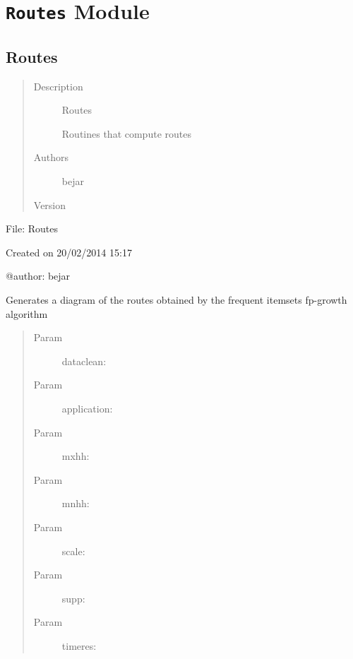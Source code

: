 \documentclass[letterpaper,10pt,english]{sphinxmanual}
\begin{document}
\chapter{\texttt{Routes} Module}
\label{index:routes-module}\label{index:module-SuperHub.Routes}\label{index:module-Routes}

\section{Routes}
\label{index:routes}\begin{quote}\begin{description}
\item[{Description}] \leavevmode
Routes

Routines that compute routes

\item[{Authors}] \leavevmode
bejar

\item[{Version}] 

\end{description}\end{quote}

File: Routes

Created on 20/02/2014 15:17

@author: bejar

\begin{fulllineitems}
\label{index:SuperHub.Routes.transaction_routes}
Generates a diagram of the routes obtained by the frequent itemsets fp-growth algorithm
\begin{quote}\begin{description}
\item[{Param }] \leavevmode
dataclean:

\item[{Param }] \leavevmode
application:

\item[{Param }] \leavevmode
mxhh:

\item[{Param }] \leavevmode
mnhh:

\item[{Param }] \leavevmode
scale:

\item[{Param }] \leavevmode
supp:

\item[{Param }] \leavevmode
timeres:

\end{description}\end{quote}

\end{fulllineitems}
\end{document}
